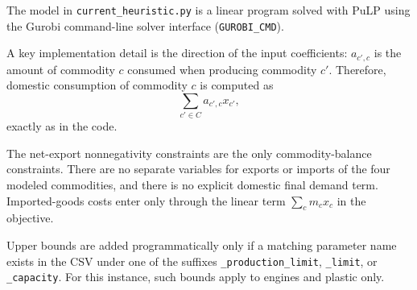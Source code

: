 The model in \texttt{current\_heuristic.py} is a linear program solved with PuLP using the Gurobi command-line solver interface (\texttt{GUROBI\_CMD}).

A key implementation detail is the direction of the input coefficients: \(a_{c',c}\) is the amount of commodity \(c\) consumed when producing commodity \(c'\). Therefore, domestic consumption of commodity \(c\) is computed as
\[
\sum_{c' \in C} a_{c',c} x_{c'},
\]
exactly as in the code.

The net-export nonnegativity constraints are the only commodity-balance constraints. There are no separate variables for exports or imports of the four modeled commodities, and there is no explicit domestic final demand term. Imported-goods costs enter only through the linear term \(\sum_c m_c x_c\) in the objective.

Upper bounds are added programmatically only if a matching parameter name exists in the CSV under one of the suffixes \texttt{\_production\_limit}, \texttt{\_limit}, or \texttt{\_capacity}. For this instance, such bounds apply to engines and plastic only.
